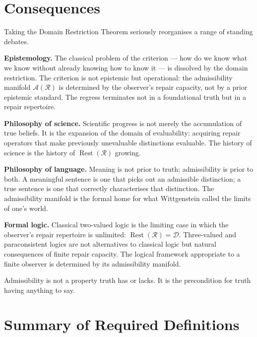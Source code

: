 \documentclass[12pt, oneside]{article}
\theoremstyle{plain}
\theoremstyle{definition}
\theoremstyle{remark}
\DeclareMathOperator{\Rest}{Rest}
\newcommand{\AO}{\mathcal{A}}
\newcommand{\Dsub}{\mathcal{D}}
\newcommand{\RestR}{\Rest(\mathcal{R})}
\begin{document}
\section{Consequences}
\label{sec:consequences}

Taking the Domain Restriction Theorem seriously reorganises a
range of standing debates.

\medskip\noindent
\textbf{Epistemology.}\;
The classical problem of the criterion --- how do we know what we
know without already knowing how to know it --- is dissolved by
the domain restriction.
The criterion is not epistemic but operational: the admissibility
manifold $\AO(\mathcal{R})$ is determined by the observer's repair
capacity, not by a prior epistemic standard.
The regress terminates not in a foundational truth but in a repair
repertoire.

\medskip\noindent
\textbf{Philosophy of science.}\;
Scientific progress is not merely the accumulation of true beliefs.
It is the expansion of the domain of evaluability: acquiring repair
operators that make previously unevaluable distinctions evaluable.
The history of science is the history of $\RestR$ growing.

\medskip\noindent
\textbf{Philosophy of language.}\;
Meaning is not prior to truth; admissibility is prior to both.
A meaningful sentence is one that picks out an admissible
distinction; a true sentence is one that correctly characterises
that distinction.
The admissibility manifold is the formal home for what Wittgenstein
called the limits of one's world.

\medskip\noindent
\textbf{Formal logic.}\;
Classical two-valued logic is the limiting case in which the
observer's repair repertoire is unlimited: $\RestR = \Dsub$.
Three-valued and paraconsistent logics are not alternatives to
classical logic but natural consequences of finite repair capacity.
The logical framework appropriate to a finite observer is
determined by its admissibility manifold.

\medskip
Admissibility is not a property truth has or lacks.
It is the precondition for truth having anything to say.


\appendix
\section{Summary of Required Definitions}
\label{app:defs}
\end{document}
